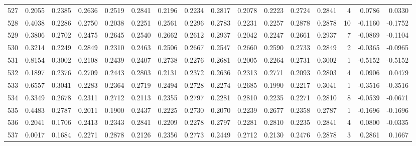 \begin{tabular}{lrrrrrrrrrrrrrrr}
527 &      0.2055 &  0.2385 &  0.2636 &  0.2519 &  0.2841 &  0.2196 &  0.2234 &  0.2817 &  0.2078 &  0.2223 &   0.2724 &     0.2841 &      4 &                    0.0786 &                     0.0330 \\
528 &      0.4038 &  0.2286 &  0.2750 &  0.2038 &  0.2251 &  0.2561 &  0.2296 &  0.2783 &  0.2231 &  0.2257 &   0.2878 &     0.2878 &     10 &                   -0.1160 &                    -0.1752 \\
529 &      0.3806 &  0.2702 &  0.2475 &  0.2645 &  0.2540 &  0.2662 &  0.2612 &  0.2937 &  0.2042 &  0.2247 &   0.2661 &     0.2937 &      7 &                   -0.0869 &                    -0.1104 \\
530 &      0.3214 &  0.2249 &  0.2849 &  0.2310 &  0.2463 &  0.2506 &  0.2667 &  0.2547 &  0.2660 &  0.2590 &   0.2733 &     0.2849 &      2 &                   -0.0365 &                    -0.0965 \\
531 &      0.8154 &  0.3002 &  0.2108 &  0.2439 &  0.2407 &  0.2738 &  0.2276 &  0.2681 &  0.2005 &  0.2264 &   0.2731 &     0.3002 &      1 &                   -0.5152 &                    -0.5152 \\
532 &      0.1897 &  0.2376 &  0.2709 &  0.2443 &  0.2803 &  0.2131 &  0.2372 &  0.2636 &  0.2313 &  0.2771 &   0.2093 &     0.2803 &      4 &                    0.0906 &                     0.0479 \\
533 &      0.6557 &  0.3041 &  0.2283 &  0.2364 &  0.2719 &  0.2494 &  0.2728 &  0.2274 &  0.2685 &  0.1990 &   0.2217 &     0.3041 &      1 &                   -0.3516 &                    -0.3516 \\
534 &      0.3349 &  0.2678 &  0.2311 &  0.2712 &  0.2113 &  0.2355 &  0.2797 &  0.2281 &  0.2810 &  0.2235 &   0.2271 &     0.2810 &      8 &                   -0.0539 &                    -0.0671 \\
535 &      0.4483 &  0.2787 &  0.2011 &  0.1900 &  0.2437 &  0.2225 &  0.2730 &  0.2070 &  0.2239 &  0.2677 &   0.2358 &     0.2787 &      1 &                   -0.1696 &                    -0.1696 \\
536 &      0.2041 &  0.1706 &  0.2413 &  0.2343 &  0.2841 &  0.2209 &  0.2278 &  0.2797 &  0.2281 &  0.2810 &   0.2235 &     0.2841 &      4 &                    0.0800 &                    -0.0335 \\
537 &      0.0017 &  0.1684 &  0.2271 &  0.2878 &  0.2126 &  0.2356 &  0.2773 &  0.2449 &  0.2712 &  0.2130 &   0.2476 &     0.2878 &      3 &                    0.2861 &                     0.1667 \\

\end{tabular}
